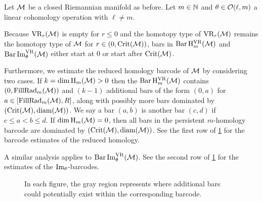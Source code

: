 Let \(\mathcal{M}\) be a closed Riemannian manifold as before.
Let \(m \in \mathbb{N}\) and \(\theta \in \mathcal{O}(\ell,m)\) a linear cohomology operation with $\ell \neq m$.

Because $\operatorname{VR}_r(\mathcal{M})$ is empty for \(r \leq 0\) and the homotopy type of $\operatorname{VR}_r(\mathcal{M})$ remains the homotopy type of $\mathcal{M}$ for $r \in (0, \operatorname{Crit}(\mathcal{M}))$, bars in \(\operatorname{Bar} \mathrm{H}_m^{\operatorname{VR}}(\mathcal{M})\) and $\operatorname{Bar}\operatorname{Im}_\theta^{\operatorname{VR}}(\mathcal{M})$ either start at $0$ or start after $\operatorname{Crit}(\mathcal{M})$.

Furthermore, we estimate the reduced homology barcode of $\mathcal{M}$ by considering two cases.
If \(k = \dim \operatorname{H}_m(\mathcal{M}) > 0\) then the $\operatorname{Bar}\mathrm{H}_m^{\operatorname{VR}}(\mathcal{M})$ contains $(0,\operatorname{FillRad}_{m}(\mathcal{M}))$ and \((k - 1)\) additional bars of the form \((0, a)\) for \(a \in [\operatorname{FillRad}_{m}(\mathcal{M}), R]\), along with possibly more bars dominated by \((\operatorname{Crit}(\mathcal{M}), \operatorname{diam}(\mathcal{M}))\). 
We say a bar $(a, b)$ is  another bar $(c,d)$ if $c \leq a < b \leq d$.
If $\dim \operatorname{H}_m(\mathcal{M}) = 0$, then all bars in the persistent $m$-homology barcode %
are dominated by \((\operatorname{Crit}(\mathcal{M}), \operatorname{diam}(\mathcal{M}))\).
See the first row of \cref{fig:barcodes_general} for the barcode estimates of the reduced homology.

A similar analysis applies to $\operatorname{Bar}\operatorname{Im}_\theta^{\operatorname{VR}}(\mathcal{M})$.
See the second row of \cref{fig:barcodes_general} for the estimates of the $\operatorname{Im}_\theta$-barcodes.

\begin{figure}
	\centering
	
	\caption{In each figure, the gray region represents where additional bars could potentially exist within the corresponding barcode.}
	\label{fig:barcodes_general}
\end{figure}